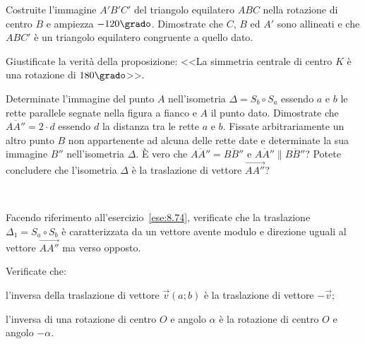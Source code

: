 \begin{esercizio}
\label{ese:8.62} %
Costruite l'immagine $A'B'C'$ del triangolo equilatero $ABC$ nella 
rotazione di centro $B$ e ampiezza $-120\grado$. Dimostrate che $C$, 
$B$ ed $A'$ sono allineati e che $ABC'$ è un triangolo equilatero 
congruente a quello dato.
\end{esercizio}

\begin{esercizio}
\label{ese:8.68} %
Giustificate la verità della proposizione: <<La simmetria centrale di 
centro $K$ è una rotazione di $180\grado$>>.
\end{esercizio}

\begin{esercizio}
\label{ese:8.74} %
\noindent\begin{minipage}{0.75\textwidth}\parindent15pt
Determinate l'immagine del punto $A$ nell'isometria $\Delta=S_b \circ 
S_a$ essendo $a$ e $b$ le rette parallele segnate nella figura a 
fianco e $A$ il punto dato. Dimostrate che $\overline{AA''}=2\cdot d$ 
essendo $d$ la distanza tra le rette $a$ e $b$.
Fissate arbitrariamente un altro punto $B$ non appartenente ad alcuna 
delle rette date e determinate la sua immagine $B''$ nell'isometria 
$\Delta$.
\`E vero che $\overline{AA''}=\overline{BB''}$ e $\overline{AA''} 
\parallel \overline{BB''}$? Potete concludere che l'isometria 
$\Delta$ è la traslazione di vettore $\overrightarrow{AA''}$?
\end{minipage}\hfil
\begin{minipage}{0.3\textwidth}
  \centering~~
\end{minipage}\vspace{8pt}
\end{esercizio}

\begin{esercizio}
\label{ese:8.75} %
Facendo riferimento all'esercizio~\ref{ese:8.74}, verificate che la 
traslazione $\Delta_1 = S_a \circ S_b$ è caratterizzata da un vettore 
avente modulo e direzione uguali al vettore $\overrightarrow{AA''}$ 
ma verso opposto.
\end{esercizio}

\begin{esercizio}
\label{ese:8.82} %
Verificate che:
\begin{enumeratea}
\item l'inversa della traslazione di vettore $\vec{v}(a;b)$ è la 
traslazione di vettore $-\vec{v}$;
\item l'inversa di una rotazione di centro $O$ e angolo $\alpha$ è la 
rotazione di centro $O$ e angolo $-\alpha$.
\end{enumeratea}
\end{esercizio}

